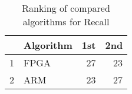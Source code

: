 \begin{table}
\footnotesize
\caption{Ranking of compared algorithms for Recall}
\label{tab:places Recall}
\begin{tabular}{llrr}
\hline
 & Algorithm & 1st & 2nd \\
\hline
1 & FPGA & 27 & 23 \\
2 & ARM & 23 & 27 \\
\hline
\end{tabular}
\end{table}

